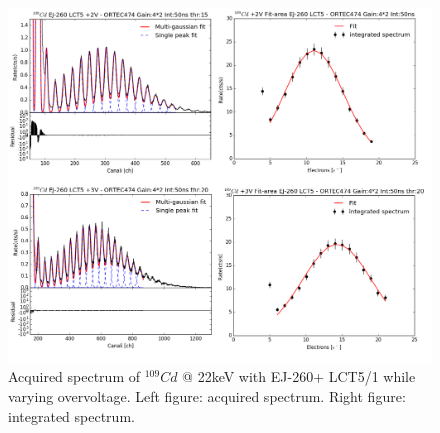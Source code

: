 \documentclass[10pt,a4paper, openany]{book}
\begin{document}
\begin{figure}[!h]
\begin{center}
\includegraphics[scale=0.35]{imm/ej260_fit.png}
\end{center}
\caption{Acquired spectrum of $^{109}Cd$ @ 22keV with EJ-260+ LCT5/1 while varying overvoltage. Left figure: acquired spectrum. Right figure: integrated spectrum.} 
\label{fig:ej260_fit}
\end{figure}
\end{document}
